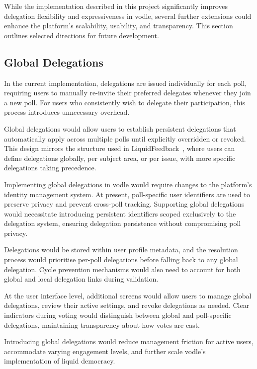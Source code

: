 While the implementation described in this project significantly improves delegation flexibility and expressiveness in vodle, several further extensions could enhance the platform's scalability, usability, and transparency. This section outlines selected directions for future development.

\subsection{Global Delegations}

In the current implementation, delegations are issued individually for each poll, requiring users to manually re-invite their preferred delegates whenever they join a new poll. For users who consistently wish to delegate their participation, this process introduces unnecessary overhead.

Global delegations would allow users to establish persistent delegations that automatically apply across multiple polls until explicitly overridden or revoked. This design mirrors the structure used in LiquidFeedback~\citep{behrens_liquidfeedback_2014}, where users can define delegations globally, per subject area, or per issue, with more specific delegations taking precedence.

Implementing global delegations in vodle would require changes to the platform's identity management system. At present, poll-specific user identifiers are used to preserve privacy and prevent cross-poll tracking. Supporting global delegations would necessitate introducing persistent identifiers scoped exclusively to the delegation system, ensuring delegation persistence without compromising poll privacy.

Delegations would be stored within user profile metadata, and the resolution process would prioritise per-poll delegations before falling back to any global delegation. Cycle prevention mechanisms would also need to account for both global and local delegation links during validation.

At the user interface level, additional screens would allow users to manage global delegations, review their active settings, and revoke delegations as needed. Clear indicators during voting would distinguish between global and poll-specific delegations, maintaining transparency about how votes are cast.

Introducing global delegations would reduce management friction for active users, accommodate varying engagement levels, and further scale vodle's implementation of liquid democracy.

